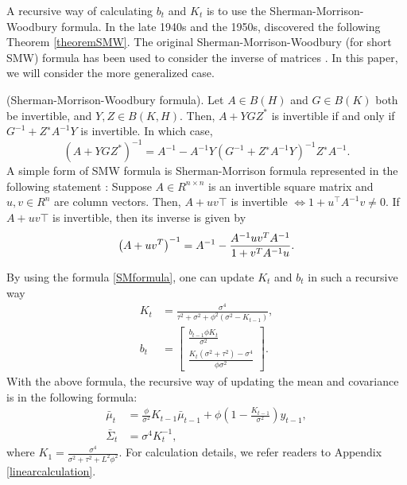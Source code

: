 A recursive way of calculating $b_t$ and $K_t$ is to use the Sherman-Morrison-Woodbury formula. In the late 1940s and the 1950s,
\cite{sherman1950adjustment, woodbury1950inverting, bartlett1951inverse, bodewig1956matrix} 
discovered the following Theorem \ref{theoremSMW}. The original Sherman-Morrison-Woodbury (for short SMW) formula has been used to consider the inverse of matrices \citep{deng2011generalization}. In this paper, we will consider the more generalized case. 
\begin{theorem}\label{theoremSMW}
(Sherman-Morrison-Woodbury formula). Let $A \in B(H)$ and $G \in B(K)$ both be invertible, and $Y, Z \in B(K, H)$. Then, $A + YGZ^*$ is invertible if and only if $G^{-1} + Z^∗A^{-1}Y$ is invertible. In which case,
\begin{equation}\label{SMWformula}
\left(A+YGZ^*\right)^{-1}= A^{-1}-A^{-1}Y\left(G^{-1}+Z^∗A^{-1}Y\right)^{-1}Z^∗A^{-1}.
\end{equation}
A simple form of SMW formula is Sherman-Morrison formula represented in the following statement \citep{bartlett1951inverse}:
Suppose $A\in R^{n\times n}$ is an invertible square matrix and $u,v\in R^n$ are column vectors. Then, $A+uv\top$ is invertible $\iff 1+u^\top A^{-1}v\neq 0$. If $A+uv\top$ is invertible, then its inverse is given by
\begin{equation}\label{SMformula}
\left(A+uv^{T}\right)^{-1}=A^{-1}-{A^{-1}uv^{T}A^{-1} \over 1+v^{T}A^{-1}u}.
\end{equation}
\end{theorem}

By using the formula \eqref{SMformula}, one can update $K_{t}$ and $b_{t}$  in such a recursive way
\begin{align}\label{linearOUKreg}
K_{t}  &=\frac{\sigma^4}{\tau^2+\sigma^2+\phi^2(\sigma^2-K_{t-1})},\\
b_{t} &= \begin{bmatrix}
\frac{b_{t-1}\phi K_{t}}{\sigma^2} \\ \label{linearOUbreg} \frac{K_{t}(\sigma^2+\tau^2)-\sigma^4 }{\phi\sigma^2}
\end{bmatrix}. 
\end{align}
With the above formula, the recursive way of updating the mean and covariance is in the following formula: 
\begin{align}
\bar{\mu}_{t}       & = \frac{\phi}{\sigma^2}K_{t-1}\bar{\mu}_{t-1} + \phi \left(1 - \frac{K_{t-1}}{\sigma^2}\right)y_{t-1}, \\
\bar{\Sigma}_{t}  &= \sigma^4K_{t}^{-1},
\end{align}
where $K_1=\frac{\sigma^4}{\sigma^2+\tau^2+L^2\phi^2}$. For calculation details, we refer readers to Appendix \ref{linearcalculation}.



